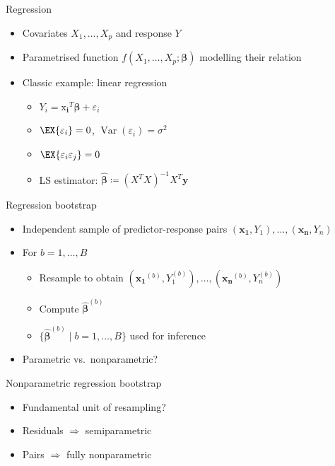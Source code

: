 \documentclass[tikz]{beamer}
\begin{document}
\begin{frame}{Regression}
    \begin{itemize}
        \item Covariates $X_1, \dots, X_p$ and response $Y$
        \item Parametrised function $f(X_1, \dots, X_p; \bm{\beta})$ modelling their relation
        \item Classic example: linear regression
              \begin{itemize}
                  \item $Y_i = \bm{\mathrm{x}_i}^T \bm{\beta} + \varepsilon_i$
                  \item $\EX{\varepsilon_i} = 0$, $\operatorname{Var}(\varepsilon_i) = \sigma^2$
                  \item $\EX{\varepsilon_i \varepsilon_j} = 0$
                  \item LS estimator: $\widehat{\bm{\beta}} \coloneqq (X^T X)^{-1} X^T \mathbf{y}$
              \end{itemize}
    \end{itemize}
\end{frame}

\begin{frame}{Regression bootstrap}
    \begin{itemize}
        \item Independent sample of predictor-response pairs $(\mathbf{x_1}, Y_1), \dots, (\mathbf{x_n}, Y_n)$
        \item For $b = 1, \dots, B$
              \begin{itemize}
                  \item Resample to obtain $(\mathbf{x_1}^{(b)}, Y_1^{(b)}), \dots, (\mathbf{x_n}^{(b)}, Y_n^{(b)})$
                  \item Compute $\widehat{\bm{\beta}}^{(b)}$
                  \item $\{ \widehat{\bm{\beta}}^{(b)} \mid b = 1, \dots, B \}$ used for inference
              \end{itemize}
        \item Parametric vs.\ nonparametric?
    \end{itemize}
\end{frame}

\begin{frame}{Nonparametric regression bootstrap}
    \begin{itemize}
        \item Fundamental unit of resampling?
        \item Residuals $\Rightarrow$ semiparametric
        \item Pairs $\Rightarrow$ fully nonparametric
    \end{itemize}
\end{frame}
\end{document}
